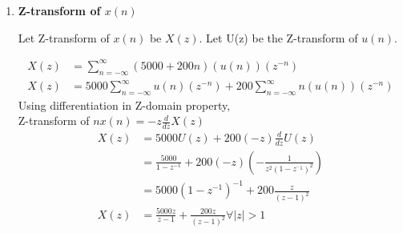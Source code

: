 \documentclass[journal,12pt,twocolumn]{IEEEtran}
\theoremstyle{remark}
\begin{document}
\begin{enumerate}
\item \textbf{Z-transform of $x(n)$}

Let Z-transform of $x(n)$ be $X(z)$. Let U(z) be the Z-transform of $u(n)$.

\begin{align}
X(z) &= \sum_{n = -\infty}^{\infty} (5000 + 200n)(u(n))(z^{-n}) \\
X(z) &= 5000\sum_{n = -\infty}^{\infty} u(n)(z^{-n}) + 200\sum_{n = -\infty}^{\infty}n(u(n))(z^{-n})
\end{align}
Using differentiation in Z-domain property,\\Z-transform of $nx(n) = -z\frac{d}{dz}X(z)$
\begin{align}
X(z) &= 5000U(z) + 200(-z)\frac{d}{dz} U(z) \\
&= \frac{5000}{1 - z^{-1}} + 200(-z)(-\frac{1}{z^2(1 -z^{^-1})^2}) \\
&= 5000(1 - z^{-1})^{-1} + 200\frac{z}{(z - 1)^2} \\
X(z) &= \frac{5000z}{z - 1} + \frac{200z}{(z - 1)^2} \forall |z| > 1
\end{align}

\end{enumerate}
\end{document}
